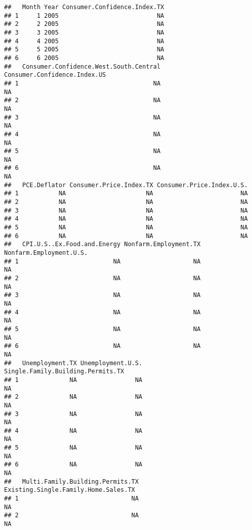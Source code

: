 \documentclass[
]{article}
\begin{document}
\begin{verbatim}
##   Month Year Consumer.Confidence.Index.TX
## 1     1 2005                           NA
## 2     2 2005                           NA
## 3     3 2005                           NA
## 4     4 2005                           NA
## 5     5 2005                           NA
## 6     6 2005                           NA
##   Consumer.Confidence.West.South.Central Consumer.Confidence.Index.US
## 1                                     NA                           NA
## 2                                     NA                           NA
## 3                                     NA                           NA
## 4                                     NA                           NA
## 5                                     NA                           NA
## 6                                     NA                           NA
##   PCE.Deflator Consumer.Price.Index.TX Consumer.Price.Index.U.S.
## 1           NA                      NA                        NA
## 2           NA                      NA                        NA
## 3           NA                      NA                        NA
## 4           NA                      NA                        NA
## 5           NA                      NA                        NA
## 6           NA                      NA                        NA
##   CPI.U.S..Ex.Food.and.Energy Nonfarm.Employment.TX Nonfarm.Employment.U.S.
## 1                          NA                    NA                      NA
## 2                          NA                    NA                      NA
## 3                          NA                    NA                      NA
## 4                          NA                    NA                      NA
## 5                          NA                    NA                      NA
## 6                          NA                    NA                      NA
##   Unemployment.TX Unemployment.U.S. Single.Family.Building.Permits.TX
## 1              NA                NA                                NA
## 2              NA                NA                                NA
## 3              NA                NA                                NA
## 4              NA                NA                                NA
## 5              NA                NA                                NA
## 6              NA                NA                                NA
##   Multi.Family.Building.Permits.TX Existing.Single.Family.Home.Sales.TX
## 1                               NA                                   NA
## 2                               NA                                   NA

\end{verbatim}
\end{document}
